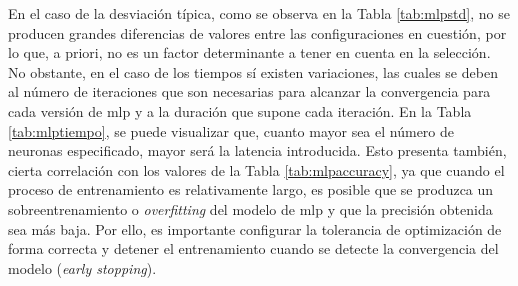 \vspace{3mm}

En el caso de la desviación típica, como se observa en la Tabla \ref{tab:mlpstd}, no se producen grandes diferencias de valores entre las configuraciones en cuestión, por lo que, a priori, no es un factor determinante a tener en cuenta en la selección. No obstante, en el caso de los tiempos sí existen variaciones, las cuales se deben al número de iteraciones que son necesarias para alcanzar la convergencia para cada versión de \gls{mlp} y a la duración que supone cada iteración. En la Tabla \ref{tab:mlptiempo}, se puede visualizar que, cuanto mayor sea el número de neuronas especificado, mayor será la latencia introducida. Esto presenta también, cierta correlación con los valores de la Tabla \ref{tab:mlpaccuracy}, ya que cuando el proceso de entrenamiento es relativamente largo, es posible que se produzca un sobreentrenamiento o \textit{overfitting} del modelo de \gls{mlp} y que la precisión obtenida sea más baja. Por ello, es importante configurar la tolerancia de optimización de forma correcta y detener el entrenamiento cuando se detecte la convergencia del modelo (\textit{early stopping}).

\vspace{3mm}

